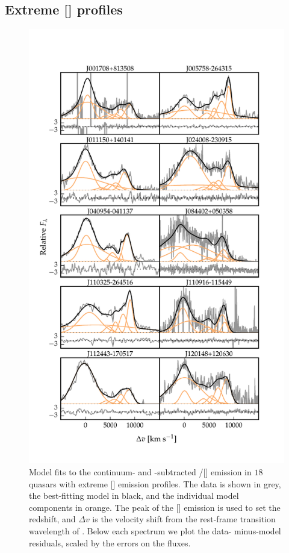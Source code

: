 \subsection{Extreme [] profiles}
\label{sec:extreme_oiii}

\begin{figure}
    \centering
    \includegraphics[width=\columnwidth]{figures/chapter04/example_spectrum_grid_extreme_oiii_1.pdf} 
    \caption[{Model fits to the \hbns/[] emission in $18$ quasars with extreme [] emission profiles.}]{Model fits to the continuum- and -subtracted \hbns/[] emission in $18$ quasars with extreme [] emission profiles. The data is shown in grey, the best-fitting model in black, and the individual model components in orange. The peak of the [] emission is used to set the redshift, and $\Delta{v}$ is the velocity shift from the rest-frame transition wavelength of \hbns. Below each spectrum we plot the data- minus-model residuals, scaled by the errors on the fluxes.}     
    \label{fig:example_spectrum_grid_extreme_oiii}
\end{figure}

